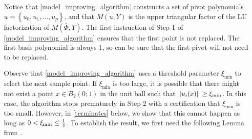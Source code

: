 
%
%
%
%


Notice that \cref{model_improving_algorithm} constructs a set of pivot polynomials $u = \left\{u_0, u_1, \ldots, u_p\right\}$,
and that $M(u, Y)$ is the upper triangular factor of the LU factorization of $M(\bar \Phi, Y)$.
The first instruction of Step 1 of \cref{model_improving_algorithm} ensures that the first point is not replaced.
The first basis polynomial is always $1$, so can be sure that the first pivot will not need to be replaced.

Observe that \cref{model_improving_algorithm} uses a threshold parameter $\xi_{\min}$ to select the next sample point.
If $\xi_{\min}$ is too large, it is possible that there might not exist a point $x \in B_2(0;1)$ 
in the unit ball such that $\|u_i(x)\| \ge \xi_{\text{min}}$.
In this case, the algorithm stops prematurely in Step 2 with a certification that $\xi_{\min}$ is too small.
However,  in \cref{terminates} below, we show that this cannot happen as long as $0 < \xi_{\text{min}} \le \frac 1 4$.
To establish the result, we first need the following Lemma from \cite{introduction_book}.



